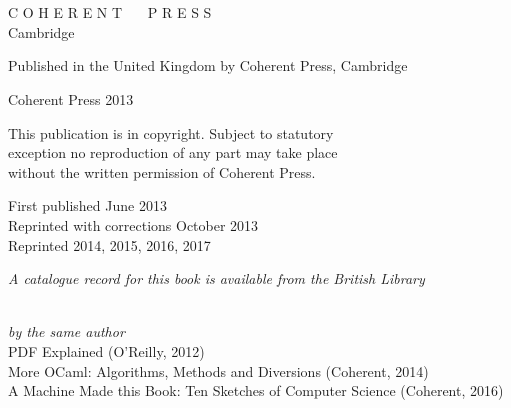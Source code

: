 \documentclass[]{book}
\newcommand{\smspace}{\vspace{4mm}}
\begin{document}
\clearpage

\chapter*{} %
\thispagestyle{empty}

\begin{center}

\vphantom{a}%

\vspace{10mm}

\noindent C O H E R E N T \ \ \ P R E S S\\ \vspace{1mm} \footnotesize Cambridge

\vspace{3mm}

\noindent Published in the United Kingdom by Coherent Press, Cambridge

\vspace{3mm}

\noindent {\small \copyright} Coherent Press 2013

\vspace{3mm}

\noindent This publication is in copyright. Subject to statutory\\ exception no reproduction of any part may take place\\ without the written permission of Coherent Press.

\vspace{3mm}

\noindent First published June 2013\\
Reprinted with corrections October 2013\\
Reprinted 2014, 2015, 2016, 2017

\vspace{3mm}



\noindent \textit{A catalogue record for this book is available from the British Library}\\

\smspace


\vphantom{a}~{} \\
\vspace{20mm}
\noindent \textit{by the same author}\\

\vspace{10mm}
PDF Explained (O'Reilly, 2012)\\
More OCaml: Algorithms, Methods and Diversions (Coherent, 2014)\\
A Machine Made this Book: Ten Sketches of Computer Science (Coherent, 2016)

\end{center}
\end{document}
